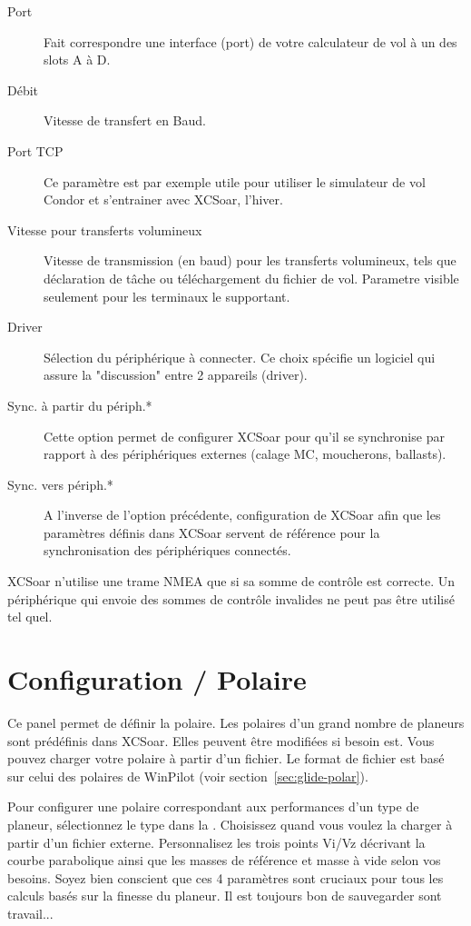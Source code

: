 \begin{description}
\item[Port]  Fait correspondre une interface (port) de votre calculateur de vol à un des slots A à D.
\item[Débit]  Vitesse de transfert en Baud.
\item[Port TCP]  Ce paramètre est par exemple utile pour utiliser le simulateur de vol Condor et s'entrainer avec XCSoar, l'hiver.
\item[Vitesse pour transferts volumineux]  Vitesse de transmission (en baud) pour les transferts volumineux, tels que déclaration de tâche ou téléchargement du fichier de vol. Parametre visible seulement pour les terminaux le supportant.
\item[Driver]  Sélection du périphérique à connecter. Ce choix spécifie un logiciel qui assure la "discussion" entre 2 appareils (driver).
\item[Sync. à partir du périph.*]  Cette option permet de configurer XCSoar pour qu'il se synchronise par rapport à des périphériques externes (calage MC, moucherons, ballasts).
\item[Sync. vers périph.*]  A l'inverse de l'option précédente, configuration de XCSoar afin que les paramètres définis dans XCSoar servent de référence pour la synchronisation des périphériques connectés.
\end{description}

XCSoar n'utilise une trame NMEA que si sa somme de contrôle est
correcte.  Un périphérique qui envoie des sommes de contrôle invalides
ne peut pas être utilisé tel quel.


\section{Configuration / Polaire}

Ce panel permet de définir la polaire. Les polaires d'un grand nombre de planeurs sont prédéfinis dans XCSoar. Elles peuvent être modifiées si besoin est. Vous pouvez charger votre polaire à partir d'un fichier. Le format de fichier est basé sur celui des polaires de WinPilot (voir section~\ref{sec:glide-polar}).

\label{conf:polar} Pour configurer une polaire correspondant aux performances d'un type de planeur, sélectionnez le type dans la . Choisissez  quand vous voulez la charger à partir d'un fichier externe. Personnalisez les trois points Vi/Vz décrivant la courbe parabolique ainsi que les masses de référence et masse à vide selon vos besoins.
\tip Soyez bien conscient que ces 4 paramètres sont cruciaux pour tous les calculs basés sur la finesse du planeur. 
 Il est toujours bon de sauvegarder sont travail...

